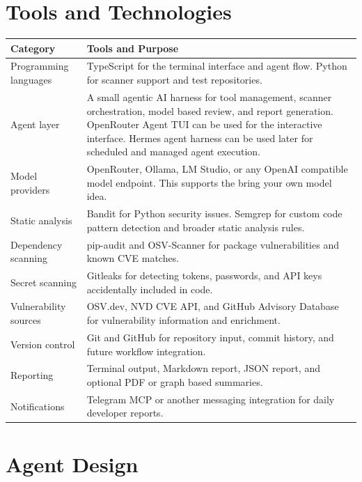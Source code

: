 \documentclass[
    numbers=noenddot,
    parskip=half-,
    fontsize=11pt,
    paper=a4,
    oneside,
    titlepage,
    bibliography=totoc,
    chapterprefix=false
]{scrbook}
\begin{document}
\chapter{Tools and Technologies}

\begin{longtable}{p{4cm}p{10cm}}
\toprule
\textbf{Category} & \textbf{Tools and Purpose} \\
\midrule
\endhead
Programming languages & TypeScript for the terminal interface and agent flow. Python for scanner support and test repositories. \\
\addlinespace
Agent layer & A small agentic AI harness for tool management, scanner orchestration, model based review, and report generation. OpenRouter Agent TUI can be used for the interactive interface. Hermes agent harness can be used later for scheduled and managed agent execution. \\
\addlinespace
Model providers & OpenRouter, Ollama, LM Studio, or any OpenAI compatible model endpoint. This supports the bring your own model idea. \\
\addlinespace
Static analysis & Bandit for Python security issues. Semgrep for custom code pattern detection and broader static analysis rules. \\
\addlinespace
Dependency scanning & pip-audit and OSV-Scanner for package vulnerabilities and known CVE matches. \\
\addlinespace
Secret scanning & Gitleaks for detecting tokens, passwords, and API keys accidentally included in code. \\
\addlinespace
Vulnerability sources & OSV.dev, NVD CVE API, and GitHub Advisory Database for vulnerability information and enrichment. \\
\addlinespace
Version control & Git and GitHub for repository input, commit history, and future workflow integration. \\
\addlinespace
Reporting & Terminal output, Markdown report, JSON report, and optional PDF or graph based summaries. \\
\addlinespace
Notifications & Telegram MCP or another messaging integration for daily developer reports. \\
\bottomrule
\end{longtable}

\chapter{Agent Design}
\end{document}
